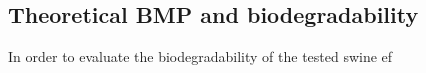 \subsection{Theoretical BMP and biodegradability}
In order to evaluate the biodegradability of the tested swine ef
